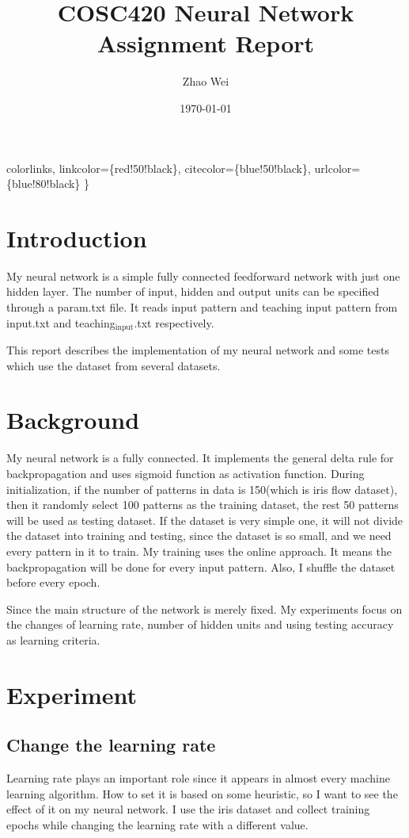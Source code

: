 \documentclass[11pt]{article}
\author{Zhao Wei}
\date{\today}
\title{COSC420 Neural Network Assignment Report}
\begin{document}
\maketitle
\tableofcontents

    colorlinks,
    linkcolor=\{red!50!black\},
    citecolor=\{blue!50!black\},
    urlcolor=\{blue!80!black\}
\}

\section{Introduction}
\label{sec-1}
My neural network is a simple fully connected feedforward network with just one hidden layer. The number of input, hidden and output units can be specified through a param.txt file. It reads input pattern and teaching input pattern from input.txt and teaching$_{\text{input}}$.txt respectively. 

This report describes the implementation of my neural network and some tests which use the dataset from several datasets. 
\section{Background}
\label{sec-2}
My neural network is a fully connected. It implements the general delta rule for backpropagation and uses sigmoid function as activation function. During initialization, if the number of patterns in data is 150(which is iris flow dataset), then it randomly select 100 patterns as the training dataset, the rest 50 patterns will be used as testing dataset. If the dataset is very simple one, it will not divide the dataset into training and testing, since the dataset is so small, and we need every pattern in it to train. My training uses the online approach. It means the backpropagation will be done for every input pattern. Also, I shuffle the dataset before every epoch.

Since the main structure of the network is merely fixed. My experiments focus on the changes of learning rate, number of hidden units and using testing accuracy as learning criteria.

\section{Experiment}
\label{sec-3}
\subsection{Change the learning rate}
\label{sec-3-1}
Learning rate plays an important role since it appears in almost every machine learning algorithm. How to set it is based on some heuristic, so I want to see the effect of it on my neural network. I use the iris dataset and collect training epochs while changing the learning rate with a different value.
\end{document}
